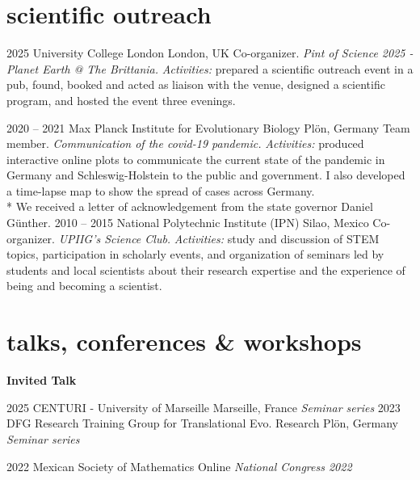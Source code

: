 \documentclass[]{friggeri-cv} %
\begin{document}
\section{scientific outreach}

\begin{entrylist}
\entry
{2025}
{}
{University College London}
{London, UK}
{Co-organizer. \emph{Pint of Science 2025 - Planet Earth @ The Brittania.}}
{\emph{Activities:} prepared a scientific outreach event in a pub, found, booked and acted as liaison with the venue, designed a scientific program, and hosted the event three evenings.}
\end{entrylist}
\begin{entrylist}
\entry
{2020 -- 2021}
{}
{Max Planck Institute for Evolutionary Biology}
{Plön, Germany}
{Team member. \emph{Communication of the covid-19 pandemic.}}
{\emph{Activities:} produced interactive online plots to communicate the current state of the pandemic in  Germany and Schleswig-Holstein to the public and government. I also developed a time-lapse map to show the spread of cases across Germany.\\
\** We received a letter of acknowledgement from the state governor Daniel Günther.}
\entry
{2010 -- 2015}
{}
{National Polytechnic Institute (IPN)}
{Silao, Mexico}
{Co-organizer. \emph{UPIIG’s Science Club.}}
{\emph{Activities:} study and discussion of STEM topics, participation in scholarly events, and organization of seminars led by students and local scientists about their research expertise and the experience of being and becoming a scientist.}
\end{entrylist}


\section{talks, conferences \& workshops}

\textbf{Invited Talk}

\begin{entrylist}
\entry
{2025}
{}
{CENTURI - University of Marseille}
{Marseille, France}
{\emph{Seminar series}}
{\vspace{-3mm}}
\entry
{2023}
{}
{DFG Research Training Group for Translational Evo. Research}
{Plön, Germany}
{\emph{Seminar series}}
{\vspace{-3mm}}
\end{entrylist}
\begin{entrylist}
\entry
{2022}
{}
{Mexican Society of Mathematics}
{Online}
{\emph{National Congress 2022}}
{\vspace{-3mm}}
\end{entrylist}
\end{document}
